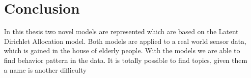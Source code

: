 \documentclass[11pt,a4paper]{article}
\begin{document}
\section{Conclusion}
\label{sec:Conc}
In this thesis two novel models are represented which are based on the Latent Dirichlet Allocation model. Both models are applied to a real world sensor data, which is gained in the house of elderly people. With the models we are able to find behavior pattern in the data.
It is totally possible to find topics, given them a name is another difficulty

\appendix

{}

\end{document}

